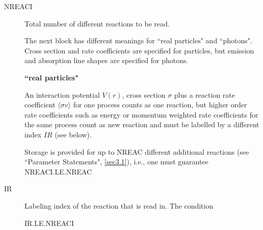 \begin{description}

  \item[NREACI] Total number of different reactions to be read.

        The next block has different meanings for ``real particles" and ``photons".
        Cross section and rate coefficients are specified for particles, but emission
        and absorption line shapes are specified for photons.

        \textbf{``real particles"} 

        An interaction potential $V(r)$, cross section $\sigma$ plus a reaction rate
        coefficient $\langle\sigma v\rangle$ for one process counts as one reaction,
        but higher order rate coefficients such as energy or momentum weighted rate
        coefficients for the same process count as new reaction and must be labelled by
        a different index $IR$ (see below).

        Storage is provided for up to NREAC different additional reactions (see
        ``Parameter Statements", \cref{sec3.1}), i.e., one must guarantee
        NREACI.LE.NREAC 

  \item[IR] Labeling index of the reaction that is read in.
        The condition 

        IR.LE.NREACI 


\end{description}
